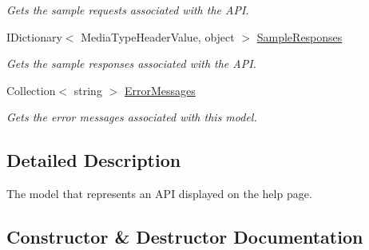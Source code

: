 \begin{DoxyCompactItemize}
\begin{DoxyCompactList}\small\item\em Gets the sample requests associated with the A\+P\+I. \end{DoxyCompactList}\item 
I\+Dictionary$<$ Media\+Type\+Header\+Value, object $>$ \hyperlink{class__1aarsproeve_web_service_1_1_areas_1_1_help_page_1_1_models_1_1_help_page_api_model_aa2176c7fd5b4e47329d2cecee146fdaa}{Sample\+Responses}
\begin{DoxyCompactList}\small\item\em Gets the sample responses associated with the A\+P\+I. \end{DoxyCompactList}\item 
Collection$<$ string $>$ \hyperlink{class__1aarsproeve_web_service_1_1_areas_1_1_help_page_1_1_models_1_1_help_page_api_model_a89a4a8ab5f162a7feca59255edef5e50}{Error\+Messages}
\begin{DoxyCompactList}\small\item\em Gets the error messages associated with this model. \end{DoxyCompactList}\end{DoxyCompactItemize}


\subsection{Detailed Description}
The model that represents an A\+P\+I displayed on the help page. 



\subsection{Constructor \& Destructor Documentation}
\hypertarget{class__1aarsproeve_web_service_1_1_areas_1_1_help_page_1_1_models_1_1_help_page_api_model_aea81d3b4b0294cd9753efb03c91bf2eb}{}
